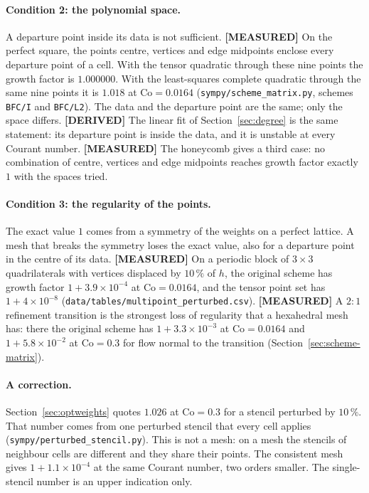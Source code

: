 \documentclass[11pt,a4paper]{article}
\newcommand{\derived}{\textcolor{blue!50!black}{\textbf{[DERIVED]}}}
\newcommand{\measured}{\textcolor{green!35!black}{\textbf{[MEASURED]}}}
\begin{document}
\paragraph{Condition 2: the polynomial space.}
A departure point inside its data is not sufficient. \measured{} On the perfect square, the
points centre, vertices and edge midpoints enclose every departure point of a cell. With the
tensor quadratic through these nine points the growth factor is $1.000000$. With the
least-squares complete quadratic through the same nine points it is $1.018$ at
$\mathrm{Co} = 0.0164$ (\texttt{sympy/scheme\_matrix.py}, schemes \texttt{BFC/I} and
\texttt{BFC/L2}). The data and the departure point are the same; only the space differs.
\derived{} The linear fit of Section~\ref{sec:degree} is the same statement: its departure
point is inside the data, and it is unstable at every Courant number. \measured{} The
honeycomb gives a third case: no combination of centre, vertices and edge midpoints reaches
growth factor exactly $1$ with the spaces tried.

\paragraph{Condition 3: the regularity of the points.}
The exact value $1$ comes from a symmetry of the weights on a perfect lattice. A mesh that
breaks the symmetry loses the exact value, also for a departure point in the centre of its
data. \measured{} On a periodic block of $3\times3$ quadrilaterals with vertices displaced by
$10\,\%$ of $h$, the original scheme has growth factor $1 + 3.9\times10^{-4}$ at
$\mathrm{Co} = 0.0164$, and the tensor point set has $1 + 4\times10^{-8}$
(\texttt{data/tables/multipoint\_perturbed.csv}). \measured{} A $2{:}1$ refinement transition
is the strongest loss of regularity that a hexahedral mesh has: there the original scheme has
$1 + 3.3\times10^{-3}$ at $\mathrm{Co} = 0.0164$ and $1 + 5.8\times10^{-2}$ at
$\mathrm{Co} = 0.3$ for flow normal to the transition (Section~\ref{sec:scheme-matrix}).

\paragraph{A correction.}
Section~\ref{sec:optweights} quotes $1.026$ at $\mathrm{Co} = 0.3$ for a stencil perturbed by
$10\,\%$. That number comes from one perturbed stencil that every cell applies
(\texttt{sympy/perturbed\_stencil.py}). This is not a mesh: on a mesh the stencils of
neighbour cells are different and they share their points. The consistent mesh gives
$1 + 1.1\times10^{-4}$ at the same Courant number, two orders smaller. The single-stencil
number is an upper indication only.
\end{document}
